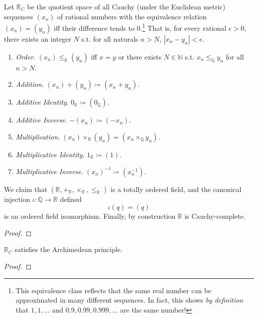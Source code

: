  \begin{definition}
    Let $\mathbb{R}_C$ be the quotient space of all Cauchy (under the Euclidean metric) sequences $(x_n)$ of rational numbers with the equivalence relation $(x_n) = (y_n)$ iff their difference tends to $0$.\footnote{This equivalence class reflects that the same real number can be approximated in many different sequences. In fact, this shows \textit{by definition} that $1, 1, \ldots$ and $0.9, 0.99, 0.999, \ldots$ are the same number!} That is, for every rational $\epsilon > 0$, there exists an integer $N$ s.t. for all naturals $n > N$, $|x_n - y_n| < \epsilon$. 
    \begin{enumerate}
      \item \textit{Order}. $(x_n) \leq_{\mathbb{R}} (y_n)$ iff $x = y$ or there exists $N \in \mathbb{N}$ s.t. $x_n \leq_{\mathbb{Q}} y_n$ for all $n > N$. 
      \item \textit{Addition}. $(x_n) + (y_n) \coloneqq (x_n + y_n)$. 
      \item \textit{Additive Identity}. $0_{\mathbb{R}} \coloneqq (0_{\mathbb{Q}})$. 
      \item \textit{Additive Inverse}. $-(x_n) \coloneqq (-x_n)$. 
      \item \textit{Multiplication}. $(x_n) \times_{\mathbb{R}} (y_n) = (x_n \times_{\mathbb{Q}} y_n)$. 
      \item \textit{Multiplicative Identity}. $1_{\mathbb{R}} \coloneqq (1)$. 
      \item \textit{Multiplicative Inverse}. $(x_n)^{-1} \coloneqq (x_n^{-1})$. 
    \end{enumerate}
    We claim that $(\mathbb{R}, +_{\mathbb{R}}, \times_{\mathbb{R}}, \leq_{\mathbb{R}})$ is a totally ordered field, and the canonical injection $\iota: \mathbb{Q} \rightarrow \mathbb{R}$ defined 
    \begin{equation}
      \iota(q) = (q)
    \end{equation} 
    is an ordered field isomorphism. Finally, by construction $\mathbb{R}$ is Cauchy-complete. 
  \end{definition}
  \begin{proof}
    
  \end{proof}

  \begin{theorem}
    $\mathbb{R}_C$ satisfies the Archimedean principle. 
  \end{theorem}
  \begin{proof}
    
  \end{proof}

